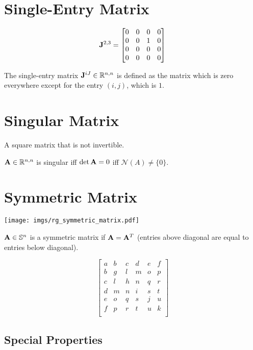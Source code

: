 \section{Single-Entry Matrix}
\label{sec:rogue_single_entry}
\begin{equation}
\mathbf{J}^{2,3} =
\begin{bmatrix}
0 & 0 & 0 & 0 \\
0 & 0 & 1 & 0 \\
0 & 0 & 0 & 0 \\
0 & 0 & 0 & 0
\end{bmatrix}
\end{equation}

The single-entry matrix $\mathbf{J}^{iJ}\in\mathbb{R}^{n,n}$ is defined as the matrix which is zero everywhere except for the entry $(i,j)$, which is $1$.





\section{Singular Matrix}
A square matrix that is not invertible.

$\mathbf{A}\in\mathbb{R}^{n,n}$ is singular iff $\det \mathbf{A}=0$ iff $\mathcal{N}(A)\ne\{0\}$.


\section{Symmetric Matrix}

\begin{center}
\texttt{[image: imgs/rg\_symmetric\_matrix.pdf]}
\end{center}

$\mathbf{A}\in\mathbb{S}^{n}$ is a symmetric matrix if $\mathbf{A}=\mathbf{A}^T$ (entries above diagonal are equal to entries below diagonal).

\begin{equation}
\begin{bmatrix}
a & b & c & d & e & f \\
b & g & l & m & o & p \\
c & l & h & n & q & r \\
d & m & n & i & s & t \\
e & o & q & s & j & u \\
f & p & r & t & u & k \\
\end{bmatrix}
\end{equation}


\subsection*{Special Properties}

